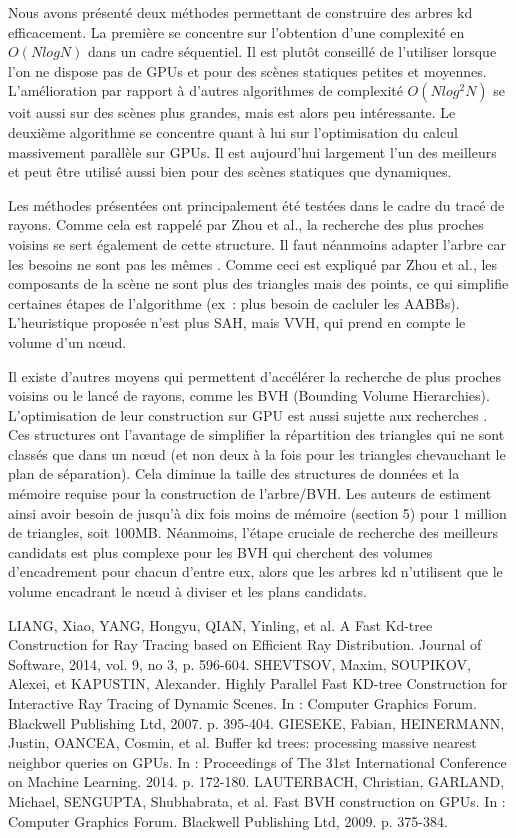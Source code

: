 \documentclass[a4paper]{article}
\begin{document}
Nous avons présenté deux méthodes permettant de construire des arbres kd efficacement. La première se concentre sur l'obtention d'une complexité en $O(NlogN)$ dans un cadre séquentiel. Il est plutôt conseillé de l'utiliser lorsque l'on ne dispose pas de GPUs et pour des scènes statiques petites et moyennes. L'amélioration par rapport à d'autres algorithmes de complexité $O(Nlog^2N)$ se voit aussi sur des scènes plus grandes, mais est alors peu intéressante. Le deuxième algorithme se concentre quant à lui sur l'optimisation du calcul massivement parallèle sur GPUs. Il est aujourd'hui largement l'un des meilleurs et peut être utilisé aussi bien pour des scènes statiques que dynamiques.

Les méthodes présentées ont principalement été testées dans le cadre du tracé de rayons. Comme cela est rappelé par Zhou et al., la recherche des plus proches voisins se sert également de cette structure. Il faut néanmoins adapter l'arbre  car les besoins ne sont pas les mêmes \cite{buffered-kdtree}. Comme ceci est expliqué par Zhou et al., les composants de la scène ne sont plus des triangles mais des points, ce qui simplifie certaines étapes de l'algorithme (ex~: plus besoin de cacluler les AABBs). L'heuristique proposée n'est plus SAH, mais VVH, qui prend en compte le volume d'un nœud.

Il existe d'autres moyens qui permettent d'accélérer la recherche de plus proches voisins ou le lancé de rayons, comme les BVH (Bounding Volume Hierarchies). L'optimisation de leur construction sur GPU est aussi sujette aux recherches \cite{bvh}. Ces structures ont l'avantage de simplifier la répartition des triangles qui ne sont classés que dans un nœud (et non deux à la fois pour les triangles chevauchant le plan de séparation). Cela diminue la taille des structures de données et la mémoire requise pour la construction de l'arbre/BVH. Les auteurs de \cite{bvh} estiment ainsi avoir besoin de jusqu'à dix fois moins de mémoire (section 5) pour 1 million de triangles, soit 100MB. Néanmoins, l'étape cruciale de recherche des meilleurs candidats est plus complexe pour les BVH qui cherchent des volumes d'encadrement pour chacun d'entre eux, alors que les arbres kd n'utilisent que le volume encadrant le nœud à diviser et les plans candidats.

\begin{thebibliography}{1}
	 LIANG, Xiao, YANG, Hongyu, QIAN, Yinling, et al. A Fast Kd-tree Construction for Ray Tracing based on Efficient Ray Distribution. Journal of Software, 2014, vol. 9, no 3, p. 596-604.
	 SHEVTSOV, Maxim, SOUPIKOV, Alexei, et KAPUSTIN, Alexander. Highly Parallel Fast KD-tree Construction for Interactive Ray Tracing of Dynamic Scenes. In : Computer Graphics Forum. Blackwell Publishing Ltd, 2007. p. 395-404.
	 GIESEKE, Fabian, HEINERMANN, Justin, OANCEA, Cosmin, et al. Buffer kd trees: processing massive nearest neighbor queries on GPUs. In : Proceedings of The 31st International Conference on Machine Learning. 2014. p. 172-180.
	 LAUTERBACH, Christian, GARLAND, Michael, SENGUPTA, Shubhabrata, et al. Fast BVH construction on GPUs. In : Computer Graphics Forum. Blackwell Publishing Ltd, 2009. p. 375-384.
\end{thebibliography}
\end{document}
